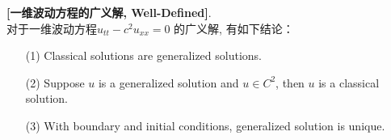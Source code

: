 	\newpage
	
	\begin{thm}\label{thm 2.3.6}
		\textbf{[一维波动方程的广义解, Well-Defined]}. \\
		对于一维波动方程$u_{tt} - c^2 u_{xx} = 0$ 的广义解, 有如下结论：
		\begin{enumerate}
			\item[(1)] Classical solutions are generalized solutions. 
			
			\item[(2)] Suppose $u$ is a generalized solution and $u \in C^2$, then $u$ is a classical solution. 
			
			\item[(3)] With boundary and initial conditions, generalized solution is unique.
		\end{enumerate}
		
		\vspace*{4em}
		

\end{thm}
